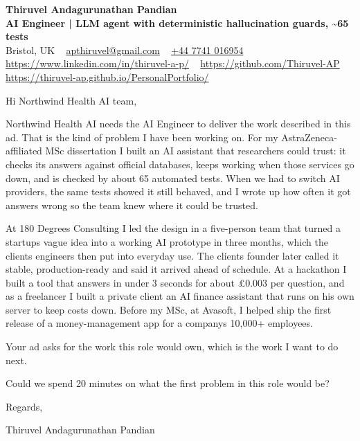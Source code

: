 \documentclass[11pt,a4paper]{article}
\begin{document}
\raggedright
\pagestyle{empty}

\begin{center}
    {\LARGE \color{linkblue} \textbf{Thiruvel Andagurunathan Pandian}}\\[0.2cm]
    {\color{headernavy}\small\textbf{AI Engineer | LLM agent with deterministic hallucination guards, \textasciitilde{}65 tests}}\\[0.2cm]
    {\small Bristol, UK\nobreak\ \,\textbar\, \href{mailto:apthiruvel@gmail.com}{apthiruvel@gmail.com}\nobreak\ \,\textbar\, \href{tel:+447741016954}{+44 7741 016954}\nobreak\ \,\textbar\, \href{https://www.linkedin.com/in/thiruvel-a-p/}{https://www.linkedin.com/in/thiruvel-a-p/}\nobreak\ \,\textbar\, \href{https://github.com/Thiruvel-AP}{https://github.com/Thiruvel-AP}\nobreak\ \,\textbar\, \href{https://thiruvel-ap.github.io/PersonalPortfolio/}{https://thiruvel-ap.github.io/PersonalPortfolio/}}

\end{center}

\vspace{0.4cm}

\noindent
Hi Northwind Health AI team,

Northwind Health AI needs the AI Engineer to deliver the work described in this ad. That is the kind of problem I have been working on. For my AstraZeneca-affiliated MSc dissertation I built an AI assistant that researchers could trust: it checks its answers against official databases, keeps working when those services go down, and is checked by about 65 automated tests. When we had to switch AI providers, the same tests showed it still behaved, and I wrote up how often it got answers wrong so the team knew where it could be trusted.

At 180 Degrees Consulting I led the design in a five-person team that turned a startup\textquotesingle{}s vague idea into a working AI prototype in three months, which the client\textquotesingle{}s engineers then put into everyday use. The client\textquotesingle{}s founder later called it \textquotedbl{}stable, production-ready\textquotedbl{} and said it arrived \textquotedbl{}ahead of schedule\textquotedbl{}. At a hackathon I built a tool that answers in under 3 seconds for about £0.003 per question, and as a freelancer I built a private client an AI finance assistant that runs on his own server to keep costs down. Before my MSc, at Avasoft, I helped ship the first release of a money-management app for a company\textquotesingle{}s 10,000+ employees.

Your ad asks for the work this role would own, which is the work I want to do next.

Could we spend 20 minutes on what the first problem in this role would be?

\vspace{0.5cm}

Regards,

Thiruvel Andagurunathan Pandian
\end{document}
